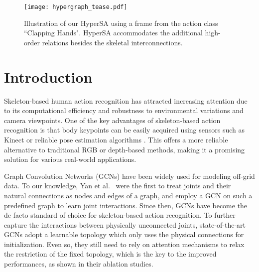 \documentclass[10pt,twocolumn,letterpaper]{article}
\begin{document}


\begin{figure}[]
  \centering
      \centering
      \texttt{[image: hypergraph\_tease.pdf]}
     \caption{Illustration of our HyperSA using a frame from the action class ``Clapping Hands".
     HyperSA accommodates the additional high-order relations besides the skeletal interconnections.}
     \label{fig:tease}
\end{figure}



\section{Introduction}
\label{sec:intro}
Skeleton-based human action recognition has attracted increasing attention due to its computational efficiency and robustness to environmental variations and camera viewpoints.
One of the key advantages of skeleton-based action recognition is that body keypoints can be easily acquired using sensors such as Kinect \cite{zhang2012microsoft}  or reliable pose estimation algorithms \cite{cao2017realtime}. 
This offers a more reliable alternative to traditional RGB or depth-based methods, making it a promising solution for various real-world applications.

Graph Convolution Networks (GCNs) have been widely used for modeling off-grid data.
To our knowledge, Yan et al.~\cite{yan2018spatial} were the first to treat joints and their natural connections as nodes and edges of a graph, and employ a GCN \cite{kipf2016semi} on such a predefined graph to learn joint interactions.
Since then, GCNs have become the de facto standard of choice for skeleton-based action recognition.
To further capture the interactions between physically unconnected joints, state-of-the-art GCNs \cite{chi2022infogcn, chen2021channel, ye2020dynamic, shi2019two, song2021constructing, song2020stronger} adopt a learnable topology which only uses the physical connections for initialization.
Even so, they still need to rely on attention mechanisms to relax the restriction of the fixed topology, which is the key to the improved performances, as shown in their ablation studies.
\end{document}
